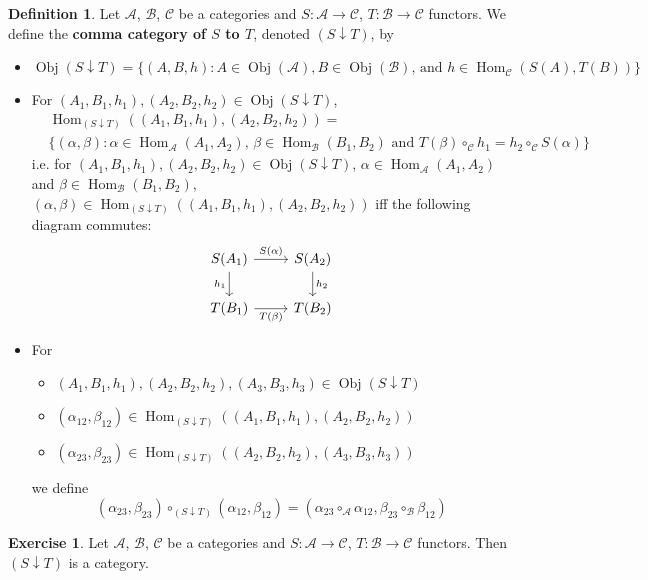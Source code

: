 \documentclass[12pt]{amsart}
\theoremstyle{definition}
\newtheorem{defn}[definition]{Definition}
\newtheorem{ex}[definition]{Exercise}
\newcommand{\al}{\alpha}
\newcommand{\be}{\beta}
\newcommand{\MA}{\mathcal{A}}
\newcommand{\MB}{\mathcal{B}}
\newcommand{\MC}{\mathcal{C}}
\DeclareMathOperator{\Obj}{Obj}
\DeclareMathOperator{\Hom}{Hom}
\DeclareMathOperator*{\0}{\mbf{0}}
\DeclareMathOperator*{\1}{\mbf{1}}
\newcommand{\lex}[1]{\label{ex:#1}}
\newcommand{\ld}[1]{\label{defn:#1}}
\begin{document}
	
	\begin{defn} \ld{13011}
		Let $\MA$, $\MB$, $\MC$ be a categories and $S: \MA \rightarrow \MC$, $T: \MB \rightarrow \MC$ functors. We define the \textbf{comma category of $S$ to $T$}, denoted $(S \downarrow T)$, by 
		\begin{itemize}
			\item $\Obj(S \downarrow T) = \{(A, B, h): A \in \Obj(\MA), B \in \Obj(\MB) \text{, and } h \in \Hom_{\MC}(S(A), T(B))\}$
			\item For $(A_1, B_1, h_1), (A_2, B_2, h_2) \in \Obj(S \downarrow T)$, 
			\begin{align*}
				& \Hom_{(S \downarrow T)}((A_1, B_1, h_1), (A_2, B_2, h_2)) = \\
				& \{(\al, \be): \al \in \Hom_{\MA}(A_1, A_2) \text{, } \be \in \Hom_{\MB}(B_1, B_2) \text{ and } T(\be) \circ_{\MC} h_1 = h_2 \circ_{\MC} S(\al)\}
			\end{align*}
			i.e. for $(A_1, B_1, h_1), (A_2, B_2, h_2) \in \Obj(S \downarrow T)$, $\al \in \Hom_{\MA}(A_1, A_2)$ and $\be \in \Hom_{\MB}(B_1, B_2)$, $(\al, \be) \in \Hom_{(S \downarrow T)}((A_1, B_1, h_1), (A_2, B_2, h_2))$ iff the following diagram commutes:
			\[ 
			\begin{tikzcd}
				S(A_1) \arrow[r, "S(\al)"] \arrow[d, "h_1"'] & S(A_2)  \arrow[d, "h_2"] \\
				T(B_1) \arrow[r, "T(\be)"']                 & T(B_2)
			\end{tikzcd}
			\]
			\item For 
			\begin{itemize}
				\item $(A_1, B_1, h_1), (A_2, B_2, h_2), (A_3, B_3, h_3) \in \Obj(S \downarrow T)$
				\item $(\al_{12}, \be_{12}) \in \Hom_{(S \downarrow T)}((A_1, B_1, h_1), (A_2, B_2, h_2))$
				\item $(\al_{23}, \be_{23}) \in \Hom_{(S \downarrow T)}((A_2, B_2, h_2), (A_3, B_3, h_3))$
			\end{itemize}
			we define 
			$$(\al_{23}, \be_{23}) \circ_{(S \downarrow T)} (\al_{12}, \be_{12}) = (\al_{23} \circ_{\MA} \al_{12}, \be_{23} \circ_{\MB} \be_{12})$$
		\end{itemize}
	\end{defn}
	
	\begin{ex} \lex{13013}
		Let $\MA$, $\MB$, $\MC$ be a categories and $S: \MA \rightarrow \MC$, $T: \MB \rightarrow \MC$ functors. Then $(S \downarrow T)$ is a category.
	\end{ex}
	
\end{document}
